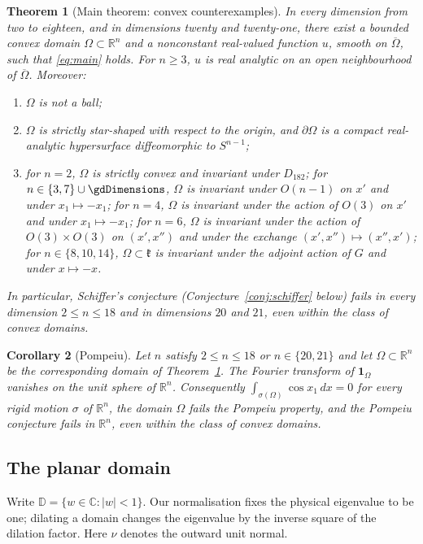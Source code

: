 \documentclass[11pt]{amsart}
\newcommand{\topdim}{18}
\newcommand{\topdimword}{eighteen}
\newtheorem{theorem}{Theorem}[section]
\newtheorem{corollary}[theorem]{Corollary}
\theoremstyle{definition}
\theoremstyle{remark}
\numberwithin{equation}{section}
\newcommand{\R}{\mathbb{R}}
\newcommand{\C}{\mathbb{C}}
\newcommand{\D}{\mathbb{D}}
\newcommand{\one}{\mathbf{1}}
\begin{document}
\begin{theorem}[Main theorem: convex counterexamples]\label{thm:main}
In every dimension from two to \topdimword, and in dimensions twenty and twenty-one, there exist a bounded convex domain $\Omega\subset\R^n$ and a nonconstant real-valued function $u$, smooth on $\overline\Omega$, such that \eqref{eq:main} holds. For $n\geq3$, $u$ is real analytic on an open neighbourhood of $\overline\Omega$. Moreover:
\begin{enumerate}[label=\textup{(\roman*)}]
\item $\Omega$ is not a ball;
\item $\Omega$ is strictly star-shaped with respect to the origin, and $\partial\Omega$ is a compact real-analytic hypersurface diffeomorphic to $S^{n-1}$;
\item for $n=2$, $\Omega$ is strictly convex and invariant under $D_{182}$; for $n\in\{3,7\}\cup\gdDimensions$, $\Omega$ is invariant under $O(n-1)$ on $x'$ and under $x_1\mapsto-x_1$; for $n=4$, $\Omega$ is invariant under the action of $O(3)$ on $x'$ and under $x_1\mapsto-x_1$; for $n=6$, $\Omega$ is invariant under the action of $O(3)\times O(3)$ on $(x',x'')$ and under the exchange $(x',x'')\mapsto(x'',x')$; for $n\in\{8,10,14\}$, $\Omega\subset\mathfrak k$ is invariant under the adjoint action of $G$ and under $x\mapsto-x$.
\end{enumerate}
In particular, Schiffer's conjecture (Conjecture~\ref{conj:schiffer} below) fails in every dimension $2\le n\le\topdim$ and in dimensions $20$ and $21$, even within the class of convex domains.
\end{theorem}

\begin{corollary}[Pompeiu]\label{cor:pompeiu}
Let $n$ satisfy $2\le n\le\topdim$ or $n\in\{20,21\}$ and let $\Omega\subset\R^n$ be the corresponding domain of Theorem~\ref{thm:main}. The Fourier transform of $\one_\Omega$ vanishes on the unit sphere of $\R^n$. Consequently $\int_{\sigma(\Omega)}\cos x_1\,dx=0$ for every rigid motion $\sigma$ of $\R^n$, the domain $\Omega$ fails the Pompeiu property, and the Pompeiu conjecture fails in $\R^n$, even within the class of convex domains.
\end{corollary}

\subsection{The planar domain}
Write $\D=\{w\in\C:|w|<1\}$. Our normalisation fixes the physical eigenvalue to be one; dilating a domain changes the eigenvalue by the inverse square of the dilation factor.
Here $\nu$ denotes the outward unit normal.
\end{document}
